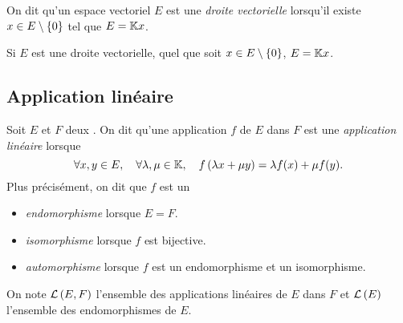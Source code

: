 \documentclass{magnolia}
\begin{document}
\begin{definition}
On dit qu'un espace vectoriel $E$ est une \emph{droite vectorielle} lorsqu'il
 existe $x\in E\setminus\left\{0\right\}$ tel que $E=\mathbb{K} x$.
\end{definition}

\begin{remarqueUnique}
\remarque Si $E$ est une droite vectorielle, quel que soit $x\in E\setminus\left\{0\right\}$,
  $E=\mathbb{K} x$.
\end{remarqueUnique}


\subsection{Application linéaire}

\begin{definition}[utile=-3]
Soit $E$ et $F$ deux \Kevs. On dit qu'une application $f$ de $E$ dans $F$ est
une \emph{application linéaire} lorsque
\[\forall x,y\in E ,\quad \forall \lambda,\mu\in\mathbb{K} ,\quad
  f\left(\lambda x+\mu y\right)=\lambda f(x)+\mu f(y).\]
Plus précisément, on dit que $f$ est un
\begin{itemize}
\item \emph{endomorphisme} lorsque $E=F$.
\item \emph{isomorphisme} lorsque $f$ est bijective.
\item \emph{automorphisme} lorsque $f$ est un endomorphisme et un isomorphisme.
\end{itemize}
On note $\mathcal{L}\left(E,F\right)$ l'ensemble des applications linéaires de $E$ dans $F$ et
$\mathcal{L}\left(E\right)$ l'ensemble des endomorphismes de $E$.
\end{definition}
\end{document}
